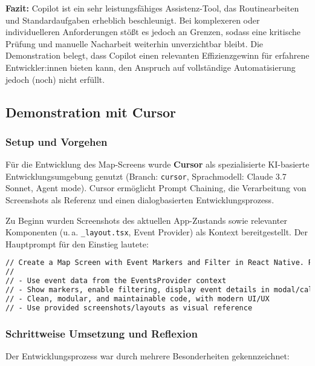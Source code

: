 \textbf{Fazit:}
Copilot ist ein sehr leistungsfähiges Assistenz-Tool, das Routinearbeiten und Standardaufgaben erheblich beschleunigt. Bei komplexeren oder individuelleren Anforderungen stößt es jedoch an Grenzen, sodass eine kritische Prüfung und manuelle Nacharbeit weiterhin unverzichtbar bleibt. Die Demonstration belegt, dass Copilot einen relevanten Effizienzgewinn für erfahrene Entwickler:innen bieten kann, den Anspruch auf vollständige Automatisierung jedoch (noch) nicht erfüllt.

\subsection{Demonstration mit Cursor}

\subsubsection{Setup und Vorgehen}
Für die Entwicklung des Map-Screens wurde \textbf{Cursor} als spezialisierte
KI-basierte Entwicklungsumgebung genutzt (Branch: \texttt{cursor},
Sprachmodell: Claude 3.7 Sonnet, Agent mode). Cursor ermöglicht Prompt
Chaining, die Verarbeitung von Screenshots als Referenz und einen
dialogbasierten Entwicklungsprozess.

Zu Beginn wurden Screenshots des aktuellen App-Zustands sowie relevanter
Komponenten (u.\,a. \texttt{\_layout.tsx}, Event Provider) als Kontext
bereitgestellt. Der Hauptprompt für den Einstieg lautete:

\begin{lstlisting}[language=HTML]
// Create a Map Screen with Event Markers and Filter in React Native. Requirements:
//
// - Use event data from the EventsProvider context
// - Show markers, enable filtering, display event details in modal/callout
// - Clean, modular, and maintainable code, with modern UI/UX 
// - Use provided screenshots/layouts as visual reference
\end{lstlisting}

\subsubsection{Schrittweise Umsetzung und Reflexion}

Der Entwicklungsprozess war durch mehrere Besonderheiten gekennzeichnet:

